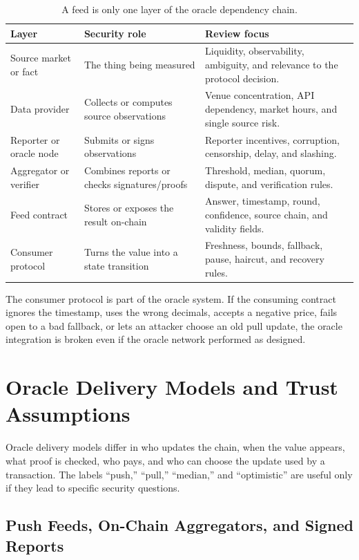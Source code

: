 \begin{table}[htbp]
\centering
\small
\renewcommand{\arraystretch}{1.16}
\begin{tabularx}{\textwidth}{@{}>{\RaggedRight\arraybackslash}p{}>{\RaggedRight\arraybackslash}p{}X@{}}
\toprule
Layer & Security role & Review focus \\
\midrule
Source market or fact & The thing being measured & Liquidity, observability, ambiguity, and relevance to the protocol decision. \\
Data provider & Collects or computes source observations & Venue concentration, API dependency, market hours, and single source risk. \\
Reporter or oracle node & Submits or signs observations & Reporter incentives, corruption, censorship, delay, and slashing. \\
Aggregator or verifier & Combines reports or checks signatures/proofs & Threshold, median, quorum, dispute, and verification rules. \\
Feed contract & Stores or exposes the result on-chain & Answer, timestamp, round, confidence, source chain, and validity fields. \\
Consumer protocol & Turns the value into a state transition & Freshness, bounds, fallback, pause, haircut, and recovery rules. \\
\bottomrule
\end{tabularx}
\caption{A feed is only one layer of the oracle dependency chain.}
\end{table}

The consumer protocol is part of the oracle system. If the consuming contract ignores the timestamp, uses the wrong decimals, accepts a negative price, fails open to a bad fallback, or lets an attacker choose an old pull update, the oracle integration is broken even if the oracle network performed as designed.

\section{Oracle Delivery Models and Trust Assumptions}

Oracle delivery models differ in who updates the chain, when the value appears, what proof is checked, who pays, and who can choose the update used by a transaction. The labels ``push,'' ``pull,'' ``median,'' and ``optimistic'' are useful only if they lead to specific security questions.

\subsection{Push Feeds, On-Chain Aggregators, and Signed Reports}

